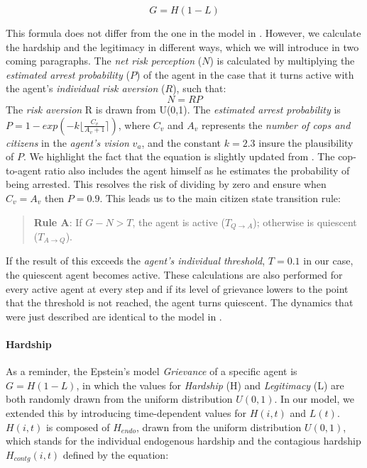 \documentclass[10pt]{article}
\begin{document}
    \begin{equation}
        G = H(1 - L)
    \end{equation}

    This formula does not differ from the one in the model in \cite{epstein2002}. However, we calculate the hardship and the legitimacy in different ways, which we will introduce in two coming paragraphs. The \emph{net risk perception} ($N$) is calculated by multiplying the \emph{estimated arrest probability} ($P$) of the agent in the case that it turns active with the agent's \emph{individual risk aversion} ($R$), such that:
    \begin{equation}
        N = RP
    \end{equation}
    The \emph{risk aversion} R is drawn from U(0,1). The \emph{estimated arrest probability} is $P = 1 - exp( - k \lfloor\frac{C_v}{A_v + 1}\rceil)$, where $C_v$ and $A_v$ represents the \emph{number of cops and citizens} in the \emph{agent's vision} $v_a$, and the constant $k = 2.3$ insure the plausibility of $P$. We highlight the fact that the equation is slightly updated from \citet{epstein2002}. The cop-to-agent ratio also includes the agent himself as he estimates the probability of being arrested. This resolves the risk of dividing by zero and ensure when $C_v = A_v$ then $P = 0.9$. This leads us to the main citizen state transition rule:

    \begin{quote}
        \textbf{Rule A}: If  $G - N > T$, the agent is active ($T_{Q \rightarrow A}$); otherwise is quiescent ($T_{A \rightarrow Q}$).
    \end{quote}

    If the result of this exceeds the \emph{agent's individual threshold}, $T = 0.1$ in our case, the quiescent agent becomes active. These calculations are also performed for every active agent at every step and if its level of grievance lowers to the point that the threshold is not reached, the agent turns quiescent. The dynamics that were just described are identical to the model in \cite{epstein2002}.

    \paragraph{Hardship}
    As a reminder, the Epstein's model \emph{Grievance} of a specific agent is $G = H(1 - L)$, in which the values for \emph{Hardship} (H) and \emph{Legitimacy} (L) are both randomly drawn from the uniform distribution $U(0,1)$. In our model, we extended this by introducing time-dependent values for $H(i,t)$ and $L(t)$. $H(i,t)$ is composed of $H_{endo}$, drawn from the uniform distribution $U(0, 1)$, which stands for the individual endogenous hardship and the contagious hardship $H_{contg}(i,t)$ defined by the equation:
\end{document}
